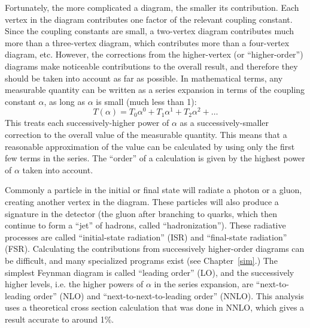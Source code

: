 Fortunately, the more complicated a diagram, 
the smaller its contribution.  
Each vertex in the diagram contributes 
one factor of the relevant coupling constant. 
Since the coupling constants are small, 
a two-vertex diagram contributes much more 
than a three-vertex diagram, 
which contributes more than a 
four-vertex diagram, etc.  
However, the corrections from the higher-vertex 
(or ``higher-order'') 
diagrams make noticeable contributions 
to the overall result, 
and therefore they should be taken into 
account as far as possible.  
In mathematical terms, 
any measurable quantity can be written as 
a series expansion in terms of the coupling constant $\alpha$, 
as long as $\alpha$ is small (much less than 1): 
\[
T(\alpha) = T_0 \alpha^0 + T_1 \alpha^1 + T_2 \alpha^2 + \ldots
\]
This treats each successively-higher power of $\alpha$ 
as a successively-smaller correction 
to the overall value of the measurable quantity.  
This means that a reasonable approximation of the value 
can be calculated by using only the first 
few terms in the series.  
The ``order'' of a calculation is given by 
the highest power of $\alpha$ taken into account.  

Commonly a particle in the initial or final state 
will radiate a photon or a gluon, 
creating another vertex in the diagram.  
These particles will also produce a signature 
in the detector 
(the gluon after branching to quarks, 
which then continue to form 
a ``jet'' of hadrons, 
called ``hadronization''). 
These radiative processes are called 
``initial-state radiation'' (ISR) and 
``final-state radiation'' (FSR).  
Calculating the contributions from 
successively higher-order diagrams 
can be difficult, %
and many specialized programs exist %
(see Chapter~\ref{sim}.)  
The simplest Feynman diagram is called 
``leading order'' (LO), 
and the successively higher levels, 
i.e. the higher powers of $\alpha$ 
in the series expansion, are 
``next-to-leading order'' (NLO) and 
``next-to-next-to-leading order'' (NNLO).  
This analysis uses a theoretical 
cross section calculation that 
was done in NNLO, 
which gives a result accurate to 
around 1\%.  







